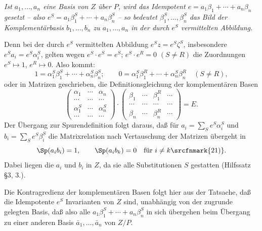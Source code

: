 \noindent\textbf{} \emph{Ist \(a_1,\ldots,a_n\) eine Basis von \(Z\) über \(P\), wird das Idempotent \(e=a_1\beta_1+\cdots+a_n\beta_n\) gesetzt -- also \(e^S=a_1\beta_1^S+\cdots+a_n\beta_n^S\) -- so bedeutet \(\beta_1^S,\ldots,\beta_n^S\) das Bild der Komplementärbasis \(b_1,\ldots,b_n\) zu \(a_1,\ldots,a_n\) in der durch \(e^S\) vermittelten Abbildung.}

Denn bei der durch \(e^S\) vermittelten Abbildung \(e^Sz=e^S\zeta^S\), insbesondere \(e^Sa_i=e^S\alpha_i^S\), gelten wegen \(e^S\cdot e^S=e^S\); \(e^S\cdot e^R=0\) \((S\ne R)\) die Zuordnungen \(e^S\mapsto1\), \(e^R\mapsto0\). Also kommt:
\[
        1=\alpha_1^S\beta_1^S+\cdots+\alpha_n^S\beta_n^S;\qquad
        0=\alpha_1^S\beta_1^R+\cdots+\alpha_n^S\beta_n^R\quad(S\ne R),
\]
oder in Matrizen geschrieben, die Definitionsgleichung der komplementären Basen
\[
\begin{pmatrix}
\alpha_1 & \cdots & \alpha_n\\
\cdots & \cdots & \cdots\\
\alpha_1^S & \cdots & \alpha_n^S\\
\cdots & \cdots & \cdots
\end{pmatrix}
\cdot
\begin{pmatrix}
\beta_1 & \cdots & \beta_1^R & \cdots\\
\cdots & \cdots & \cdots & \cdots\\
\beta_n & \cdots & \beta_n^R & \cdots
\end{pmatrix}
=
E.
\]
Der Übergang zur Spurendefinition folgt daraus, daß für \(a_i=\sum_S e^S\alpha_i^S\) und \(b_i=\sum_S e^S\beta_i^S\) die Matrixrelation nach Vertauschung der Matrizen übergeht in
\[
        \Sp(a_i b_i)=1,\qquad \Sp(a_i b_k)=0\quad\text{für }i\ne k\text{\srcfnmark{21)}}.
\]
Dabei liegen die \(a_i\) und \(b_i\) in \(Z\), da sie alle Substitutionen \(S\) gestatten (Hilfssatz §3, 3.).

Die Kontragredienz der komplementären Basen folgt hier aus der Tatsache, daß die Idempotente \(e^S\) Invarianten von \(Z\) sind, unabhängig von der zugrunde gelegten Basis, daß also alle \(a_1\beta_1^S+\cdots+a_n\beta_n^S\) in sich übergehen beim Übergang zu einer anderen Basis \(\bar a_1,\ldots,\bar a_n\) von \(Z/P\).

